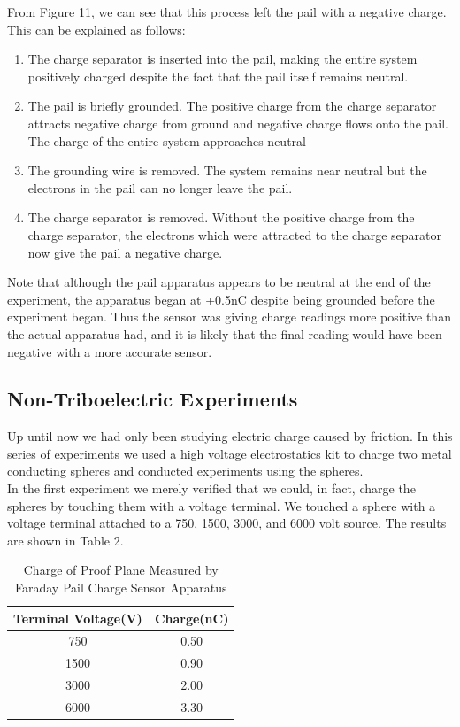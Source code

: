 \documentclass[oneside,12pt]{amsart}
\begin{document}
\indent From Figure 11, we can see that this process left the pail with a negative charge. This can be explained as follows:\\
\begin{enumerate}
	\item The charge separator is inserted into the pail, making the entire system positively charged despite the fact that the pail itself remains neutral.
	\item The pail is briefly grounded. The positive charge from the charge separator attracts negative charge from ground and negative charge flows onto the pail. The charge of the entire system approaches neutral
	\item The grounding wire is removed. The system remains near neutral but the electrons in the pail can no longer leave the pail.
	\item The charge separator is removed. Without the positive charge from the charge separator, the electrons which were attracted to the charge separator now give the pail a negative charge.
\end{enumerate}

\indent Note that although the pail apparatus appears to be neutral at the end of the experiment, the apparatus began at +0.5nC despite being grounded before the experiment began. Thus the sensor was giving charge readings more positive than the actual apparatus had, and it is likely that the final reading would have been negative with a more accurate sensor.

\subsection{Non-Triboelectric Experiments}
\indent Up until now we had only been studying electric charge caused by friction. In this series of experiments we used a high voltage electrostatics kit to charge two metal conducting spheres and conducted experiments using the spheres.\\
\indent In the first experiment we merely verified that we could, in fact, charge the spheres by touching them with a voltage terminal. We touched a sphere with a voltage terminal attached to a 750, 1500, 3000, and 6000 volt source. The results are shown in Table 2.\\
\begin{table}[H]
	\begin{tabular}{ |c|c|}
		\hline
		Terminal Voltage(V) & Charge(nC)\\
		\hline
		750&0.50\\
		1500&0.90\\
		3000&2.00\\
		6000&3.30\\
		\hline	
	\end{tabular}
	\caption{Charge of Proof Plane Measured by Faraday Pail Charge Sensor Apparatus}
\end{table}
\end{document}
